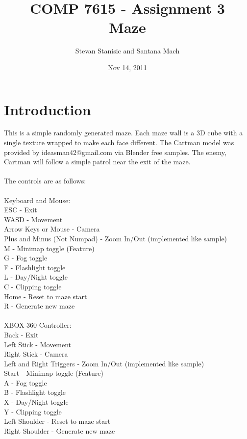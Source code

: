 \documentclass[titlepage]{article}
\begin{document}
\author{Stevan Stanisic and Santana Mach}
\title{COMP 7615 - Assignment 3 \\ Maze}
\date{Nov 14, 2011}
\maketitle{}

\pagebreak

\section{Introduction}

This is a simple randomly generated maze. Each maze wall is a 3D cube with a single texture wrapped to make each face different.
The Cartman model was provided by ideasman42@gmail.com via Blender free samples.  The enemy, Cartman will follow a simple patrol near the exit of the maze.
\\
\\
The controls are as follows: \\
\\
Keyboard and Mouse: \\
ESC - Exit \\
WASD - Movement \\
Arrow Keys or Mouse - Camera \\
Plus and Minus (Not Numpad) - Zoom In/Out (implemented like sample) \\
M - Minimap toggle (Feature) \\
G - Fog toggle \\
F - Flashlight toggle \\
L - Day/Night toggle \\
C - Clipping toggle \\
Home - Reset to maze start \\
R - Generate new maze \\
\\
XBOX 360 Controller: \\
Back - Exit \\
Left Stick - Movement \\
Right Stick - Camera \\
Left and Right Triggers - Zoom In/Out (implemented like sample) \\
Start - Minimap toggle (Feature) \\
A - Fog toggle \\
B - Flashlight toggle \\
X - Day/Night toggle \\
Y - Clipping toggle \\
Left Shoulder - Reset to maze start \\
Right Shoulder - Generate new maze \\
\end{document}
